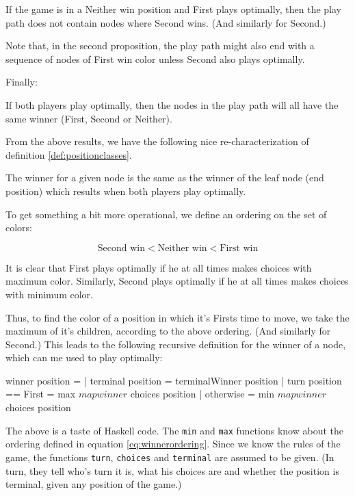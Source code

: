 \begin{proposition}
If the game is in a Neither win position and First plays optimally, then the play path does not contain nodes where Second wins.
(And similarly for Second.)
\end{proposition}

Note that, in the second proposition, the play path might also end with a sequence of nodes of First win color unless Second also plays optimally.

Finally:

\begin{proposition}
If both players play optimally, then the nodes in the play path will all have the same winner (First, Second or Neither).
\end{proposition}

From the above results, we have the following nice re-characterization of definition \ref{def:positionclasses}.

\begin{theorem}
The winner for a given node is the same as the winner of the leaf node (end position) which results when both players play optimally.
\end{theorem}


To get something a bit more operational, we define an ordering on the set of colors:

\begin{equation}
\label{eq:winnerordering}
  \text{Second win} < \text{Neither win} < \text{First win}
\end{equation}

It is clear that First plays optimally if he at all times makes choices with maximum color.
Similarly, Second plays optimally if he at all times makes choices with minimum color.

Thus, to find the color of a position in which it's Firsts time to move, we take the maximum of it's children, according to the above ordering. (And similarly for Second.)
This leads to the following recursive definition for the winner of a node, which can me used to play optimally:

\begin{code}
  winner position =
    | terminal position       = terminalWinner position
    | turn position == First  = max $ map winner $ choices position
    | otherwise               = min $ map winner $ choices position
\end{code}


The above is a taste of Haskell code.
The \texttt{min} and \texttt{max} functions know about the ordering defined in equation \ref{eq:winnerordering}.
Since we know the rules of the game, the functions \texttt{turn}, \texttt{choices} and \texttt{terminal} are assumed to be given.
(In turn, they tell who's turn it is, what his choices are and whether the position is terminal, given any position of the game.)

